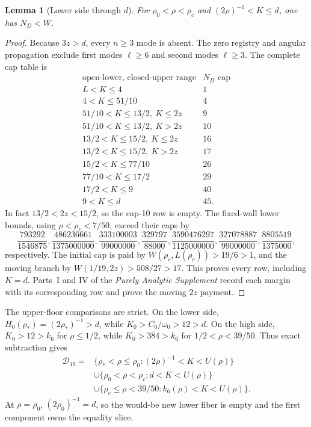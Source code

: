 \documentclass[11pt]{article}
\numberwithin{equation}{section}
\newtheorem{lemma}[theorem]{Lemma}
\theoremstyle{definition}
\theoremstyle{remark}
\begin{document}
\begin{lemma}[Lower side through \(d\)]
\label{cm:lem-lower-d}
For \(\rho_0<\rho<\rho_c\) and
\((2\rho)^{-1}<K\leq d\), one has \(N_D<W\).
\end{lemma}

\begin{proof}
Because \(3z>d\), every \(n\geq3\) mode is absent.  The zero registry and
angular propagation exclude first modes \(\ell\geq6\) and second modes
\(\ell\geq3\).  The complete cap table is
\[
\begin{array}{c|c}
\text{open-lower, closed-upper range}&N_D\text{ cap}\\ \hline
L<K\leq4&1\\
4<K\leq51/10&4\\
51/10<K\leq13/2,\ K\leq2z&9\\
51/10<K\leq13/2,\ K>2z&10\\
13/2<K\leq15/2,\ K\leq2z&16\\
13/2<K\leq15/2,\ K>2z&17\\
15/2<K\leq77/10&26\\
77/10<K\leq17/2&29\\
17/2<K\leq9&40\\
9<K\leq d&45.
\end{array}
\]
In fact \(13/2<2z<15/2\), so the cap-10 row is empty.  The fixed-wall
lower bounds, using \(\rho<\rho_c<7/50\), exceed their caps by
\[
 \frac{793292}{1546875},\frac{486236661}{1375000000},
 \frac{333100003}{99000000},\frac{329797}{88000},
 \frac{3590476297}{1125000000},\frac{327078887}{99000000},
 \frac{8805519}{1375000},
\]
respectively.  The initial cap is paid by
\(W(\rho_c,L(\rho_c))>19/6>1\), and the moving branch by
\(W(1/19,2z)>508/27>17\).  This proves every row, including \(K=d\).
 Parts~I and IV of the \emph{Purely Analytic Supplement} record each margin
 with its corresponding row and prove the moving \(2z\) payment.
\end{proof}

The upper-floor comparisons are strict.  On the lower side,
\(H_0(\rho_*)=(2\rho_*)^{-1}>d\), while
\(K_0>C_0/\omega_0>12>d\).  On the high side, \(K_0>12>k_6\) for
\(\rho\leq1/2\), while \(K_0>384>k_6\) for
\(1/2<\rho<39/50\).  Thus exact subtraction gives
\begin{equation}
\boxed{\begin{aligned}
\mathcal D_{19}={}&
\{\rho_*<\rho\leq\rho_0:(2\rho)^{-1}<K<U(\rho)\}\\
&\cup\{\rho_0<\rho<\rho_c:d<K<U(\rho)\}\\
&\cup\{\rho_c\leq\rho<39/50:k_6(\rho)<K<U(\rho)\}.
\end{aligned}}
\label{cm:eq-D19}
\end{equation}
At \(\rho=\rho_0\), \((2\rho_0)^{-1}=d\), so the would-be new lower
fiber is empty and the first component owns the equality slice.
\end{document}
